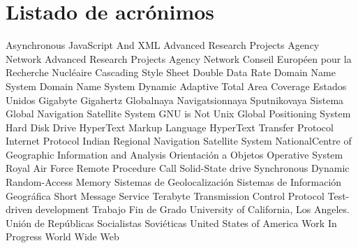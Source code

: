 \chapter{Listado de acrónimos}

{\small
\begin{acronym}[XXXXXXXX]
	         {Asynchronous JavaScript And XML}
	        {Advanced Research Projects Agency Network}
	        {Advanced Research Projects Agency Network}
	           {Conseil Européen pour la Recherche Nucléaire}
	            {Cascading Style Sheet}
	            {Double Data Rate}
	            {Domain Name System}
	            {Domain Name System}
	        {Dynamic Adaptive Total Area Coverage}
	         {Estados Unidos}
	             {Gigabyte}
	            {Gigahertz}
	        {Globalnaya Navigatsionnaya Sputnikovaya Sistema}
	           {Global Navigation Satellite System}
	            {\acs{GNU} is Not Unix}
	            {Global Positioning System}
	            {Hard Disk Drive}
	           {HyperText Markup Language}
	           {HyperText Transfer Protocol}
	             {Internet Protocol}
	          {Indian Regional Navigation Satellite System}
	          {NationalCentre of Geographic Information and Analysis}
	             {Orientación a Objetos}
	             {Operative System}
	            {Royal Air Force}
	            {Remote Procedure Call}
	            {Solid-State drive}
	          {Synchronous Dynamic Random-Access Memory}
	             {Sistemas de Geolocalización}
	            {Sistemas de Información Geográfica}
	            {Short Message Service}
	             {Terabyte}
	            {Transmission Control Protocol}
	            {Test-driven development}
	            {Trabajo Fin de Grado}
	           {University of California, Los Angeles}.
	           {Unión de Repúblicas Socialistas Soviéticas}
	            {United States of America}
	            {Work In Progress}
	            {World Wide Web}
\end{acronym}
}




